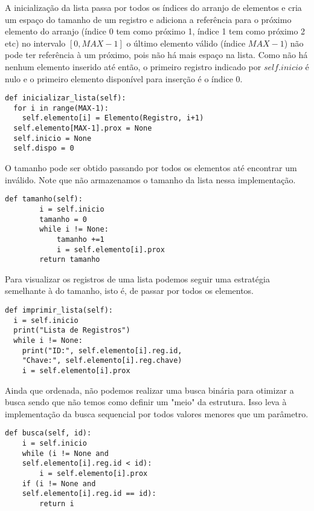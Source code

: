 \documentclass[a4paper, twocolumn]{article}
\theoremstyle{definition}
\begin{document}
A inicialização da lista passa por todos os índices do arranjo de elementos e cria um espaço do tamanho de um registro e adiciona a referência para o próximo elemento do arranjo (índice 0 tem como próximo 1, índice 1 tem como próximo 2 etc) no intervalo $[0,MAX-1]$ o último elemento válido (índice $MAX-1$) não pode ter referência à um próximo, pois não há mais espaço na lista. Como não há nenhum elemento inserido até então, o primeiro registro indicado por $self.inicio$ é nulo e o primeiro elemento disponível para inserção é o índice 0.

\begin{lstlisting}[label=lista_ligada_estat_inicializacao,caption= Lista Ligada estática ordenada (inicialização)]
def inicializar_lista(self):
  for i in range(MAX-1):
    self.elemento[i] = Elemento(Registro, i+1)
  self.elemento[MAX-1].prox = None
  self.inicio = None
  self.dispo = 0
\end{lstlisting}

O tamanho pode ser obtido passando por todos os elementos até encontrar um inválido. Note que não armazenamos o tamanho da lista nessa implementação.
\begin{lstlisting}[label=lista_ligada_estat_tamanho,caption= Lista Ligada estática ordenada (tamanho)]
def tamanho(self):
        i = self.inicio
        tamanho = 0
        while i != None:
            tamanho +=1
            i = self.elemento[i].prox
        return tamanho
\end{lstlisting}

Para visualizar os registros de uma lista podemos seguir uma estratégia semelhante à do tamanho, isto é, de passar por todos os elementos.
\begin{lstlisting}[label=lista_ligada_estat_exibicao,caption= Lista Ligada estática ordenada (exibição)]
def imprimir_lista(self):
  i = self.inicio
  print("Lista de Registros")
  while i != None:
    print("ID:", self.elemento[i].reg.id,
    "Chave:", self.elemento[i].reg.chave)
    i = self.elemento[i].prox
\end{lstlisting}

Ainda que ordenada, não podemos realizar uma busca binária para otimizar a busca sendo que não temos como definir um "meio" da estrutura. Isso leva à implementação da busca sequencial por todos valores menores que um parâmetro.
\begin{lstlisting}[label=lista_ligada_estat_busca,caption= Lista Ligada estática ordenada (busca)]
def busca(self, id):
    i = self.inicio
    while (i != None and 
    self.elemento[i].reg.id < id):
        i = self.elemento[i].prox
    if (i != None and 
    self.elemento[i].reg.id == id):
        return i
\end{lstlisting}
\end{document}
